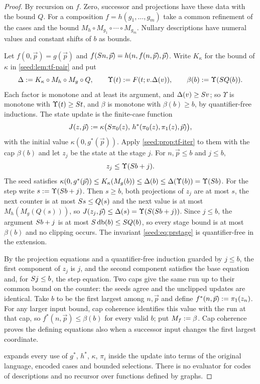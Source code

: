 \begin{proof}
By recursion on $f$. Zero, successor and projections have these data with
the bound $Q$. For a composition $f=h(g_1,\ldots,g_m)$ take a common
refinement of the cases and the bound
$M_h\circ M_{g_1}\circ\cdots\circ M_{g_m}$. Nullary descriptions have
numeral values and constant shifts of $b$ as bounds.

Let $f(0,\vec p)=g(\vec p)$ and
$f(S n,\vec p)=h(n,f(n,\vec p),\vec p)$. Write $K_\kappa$ for the bound
of $\kappa$ in \cref{seed:lem:tf-pair} and put
\[
 \Delta\mathrel{:=} K_\kappa\circ M_h\circ M_g\circ Q,\qquad
 \Upsilon(t)\mathrel{:=} F(t;v.\Delta(v)),\qquad
 \beta(b)\mathrel{:=}\Upsilon(S Q(b)).
\]
Each factor is monotone and at least its argument, and
$\Delta(v)\geq S v$; so $\Upsilon$ is monotone with
$\Upsilon(t)\geq S t$, and $\beta$ is monotone with $\beta(b)\geq b$, by
quantifier-free inductions. The state update is the finite-case function
\[
 J(z,\vec p)\mathrel{:=}
 \kappa\bigl(S\pi_0(z),\,h^{*}(\pi_0(z),\pi_1(z),\vec p)\bigr),
\]
with the initial value $\kappa(0,g^{*}(\vec p))$. Apply
\cref{seed:prop:tf-iter} to them with the cap $\beta(b)$ and let $z_j$ be
the state at the stage $j$. For $n,\vec p\leq b$ and $j\leq b$,
\begin{equation}\label{seed:eq:prstage}
 z_j\leq\Upsilon(S b+j).
\end{equation}
The seed satisfies
$\kappa(0,g^{*}(\vec p))\leq K_\kappa(M_g(b))\leq\Delta(b)
\leq\Delta(\Upsilon(b))=\Upsilon(S b)$. For the step write
$s\mathrel{:=}\Upsilon(S b+j)$. Then $s\geq b$, both projections of $z_j$ are
at most $s$, the next counter is at most $S s\leq Q(s)$ and the next
value is at most $M_h(M_g(Q(s)))$, so
$J(z_j,\vec p)\leq\Delta(s)=\Upsilon(S(S b+j))$. Since $j\leq b$, the
argument $S b+j$ is at most $S\operatorname{db}(b)\leq S Q(b)$, so
every stage bound is at most $\beta(b)$ and no clipping occurs. The
invariant \eqref{seed:eq:prstage} is quantifier-free in the extension.

By the projection equations and a quantifier-free induction guarded by
$j\leq b$, the first component of $z_j$ is $j$, and the second component
satisfies the base equation and, for $S j\leq b$, the step equation. Two
caps give the same run up to their common bound on the counter: the seeds
agree and the unclipped updates are identical. Take $b$ to be the first
largest among $n,\vec p$ and define $f^{*}(n,\vec p)\mathrel{:=}\pi_1(z_n)$. For
any larger input bound, cap coherence identifies this value with the run at
that cap, so $f^{*}(n,\vec p)\leq\beta(b)$ for every valid $b$; put
$M_f\mathrel{:=}\beta$. Cap coherence proves the defining equations also when a
successor input changes the first largest coordinate.

 expands every use of $g^{*}$, $h^{*}$, $\kappa$,
$\pi_i$ inside the update into terms of the original language, encoded
cases and bounded selections. There is no evaluator for codes of
descriptions and no recursor over functions defined by graphs.
\end{proof}

